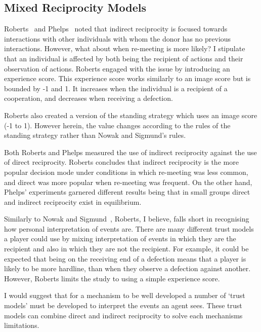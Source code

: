 \documentclass[]{final_report}
\begin{document}
\subsection{Mixed Reciprocity Models}
Roberts~\cite{evoldirindir} and Phelps~\cite{phelps_game_theoretic_analysis} noted that indirect reciprocity is focused towards interactions with other individuals with whom the donor has no previous interactions. However, what about when re-meeting is more likely? I stipulate that an individual is affected by both being the recipient of actions and their observation of actions. Roberts engaged with the issue by introducing an experience score. This experience score works similarly to an image score but is bounded by -1 and 1. It increases when the individual is a recipient of a cooperation, and decreases when receiving a defection.\par
Roberts also created a version of the standing strategy which uses an image score (-1 to 1). However herein, the value changes according to the rules of the standing strategy rather than Nowak and Sigmund's rules.\par
Both Roberts and Phelps measured the use of indirect reciprocity against the use of direct reciprocity. Roberts concludes that indirect reciprocity is the more popular decision mode under conditions in which re-meeting was less common, and direct was more popular when re-meeting was frequent. On the other hand, Phelps' experiments garnered different results being that in small groups direct and indirect reciprocity exist in equilibrium.\par
Similarly to Nowak and Sigmund~\cite{evol_indirect_image}, Roberts, I believe, falls short in recognising how personal interpretation of events are. There are many different trust models a player could use by mixing interpretation of events in which they are the recipient and also in which they are not the recipient. For example, it could be expected that being on the receiving end of a defection means that a player is likely to be more hardline, than when they observe a defection against another. However, Roberts limits the study to using a simple experience score.\par
I would suggest that for a mechanism to be well developed a number of `trust models' must be developed to interpret the events an agent sees. These trust models can combine direct and indirect reciprocity to solve each mechanisms limitations.
\end{document}
